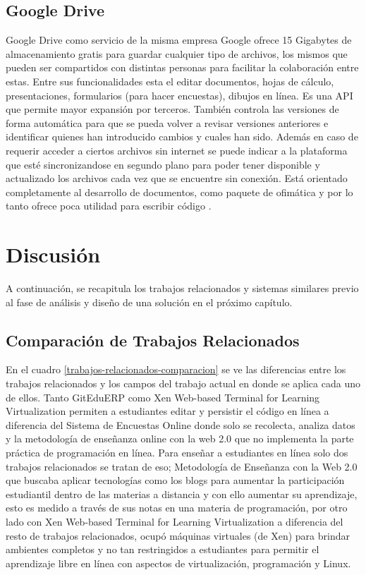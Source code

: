 \subsection{Google Drive}
Google Drive como servicio de la misma empresa Google ofrece 15 Gigabytes de almacenamiento gratis para guardar cualquier tipo de archivos, los mismos que pueden ser compartidos con distintas personas para facilitar la colaboración entre estas. Entre sus funcionalidades esta el editar documentos, hojas de cálculo, presentaciones, formularios (para hacer encuestas), dibujos en línea. Es una API que permite mayor expansión por terceros. También controla las versiones de forma automática para que se pueda volver a revisar versiones anteriores e identificar quienes han introducido cambios y cuales han sido. Además en caso de requerir acceder a ciertos archivos sin internet se puede indicar a la plataforma que esté sincronizandose en segundo plano para poder tener disponible y actualizado los archivos cada vez que se encuentre sin conexión. Está orientado completamente al desarrollo de documentos, como paquete de ofimática y por lo tanto ofrece poca utilidad para escribir código \citep{Google-Drive-Usage}.

\pagebreak
\section{Discusión}
A continuación, se recapitula los trabajos relacionados y sistemas similares previo al fase de análisis y diseño de una solución en el próximo capítulo.

\subsection{Comparación de Trabajos Relacionados}

    
En el cuadro \ref{trabajos-relacionados-comparacion} se ve las diferencias entre los trabajos relacionados y los campos del trabajo actual en donde se aplica cada uno de ellos. Tanto GitEduERP como Xen Web-based Terminal for Learning Virtualization permiten a estudiantes editar y persistir el código en línea a diferencia del Sistema de Encuestas Online donde solo se recolecta, analiza datos y la metodología de enseñanza online con la web 2.0 que no implementa la parte práctica de programación en línea. Para enseñar a estudiantes en línea solo dos trabajos relacionados se tratan de eso; Metodología de Enseñanza con la Web 2.0 que buscaba aplicar tecnologías como los blogs para aumentar la participación estudiantil dentro de las materias a distancia y con ello aumentar su aprendizaje, esto es medido a través de sus notas en una materia de programación, por otro lado con Xen Web-based Terminal for Learning Virtualization a diferencia del resto de trabajos relacionados, ocupó máquinas virtuales (de Xen) para brindar ambientes completos y no tan restringidos a estudiantes para permitir el aprendizaje libre en línea con aspectos de virtualización, programación y Linux.

